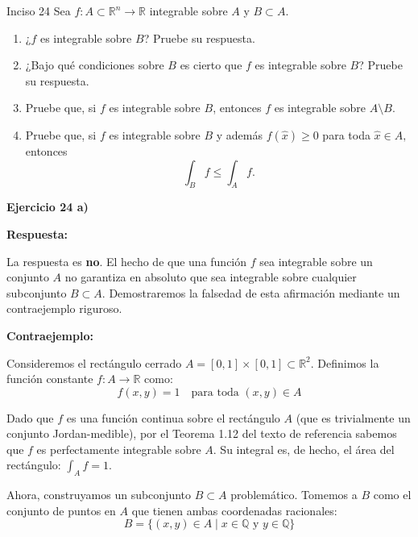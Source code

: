 \documentclass[11pt,letterpaper]{article}
\begin{document}
\begin{inciso}{Inciso 24}
Sea $f:A\subset\mathbb{R}^{n}\rightarrow\mathbb{R}$ integrable sobre $A$ y $B\subset A$.
\begin{enumerate}[label=\alph*)]
    \item ¿$f$ es integrable sobre $B$? Pruebe su respuesta.
    \item ¿Bajo qué condiciones sobre $B$ es cierto que $f$ es integrable sobre $B$? Pruebe su respuesta.
    \item Pruebe que, si $f$ es integrable sobre $B$, entonces $f$ es integrable sobre $A\setminus B$.
    \item Pruebe que, si $f$ es integrable sobre $B$ y además $f(\hat{x})\ge 0$ para toda $\hat{x}\in A,$ entonces
    \begin{equation*}
        \int_{B}f\le\int_{A}f.
    \end{equation*}
\end{enumerate}
\end{inciso}

\textbf{Ejercicio 24 a)}

\textbf{Respuesta:} 

La respuesta es \textbf{no}. El hecho de que una función $f$ sea integrable sobre un conjunto $A$ no garantiza en absoluto que sea integrable sobre cualquier subconjunto $B \subset A$. Demostraremos la falsedad de esta afirmación mediante un contraejemplo riguroso.

\textbf{Contraejemplo:}

Consideremos el rectángulo cerrado $A = [0, 1] \times [0, 1] \subset \mathbb{R}^2$. Definimos la función constante $f: A \rightarrow \mathbb{R}$ como:
\begin{equation*}
f(x,y) = 1 \quad \text{para toda } (x,y) \in A
\end{equation*}

Dado que $f$ es una función continua sobre el rectángulo $A$ (que es trivialmente un conjunto Jordan-medible), por el Teorema 1.12 del texto de referencia sabemos que $f$ es perfectamente integrable sobre $A$. Su integral es, de hecho, el área del rectángulo: $\int_A f = 1$.

Ahora, construyamos un subconjunto $B \subset A$ problemático. Tomemos a $B$ como el conjunto de puntos en $A$ que tienen ambas coordenadas racionales:
\begin{equation*}
B = \{(x,y) \in A \mid x \in \mathbb{Q} \text{ y } y \in \mathbb{Q}\}
\end{equation*}
\end{document}
